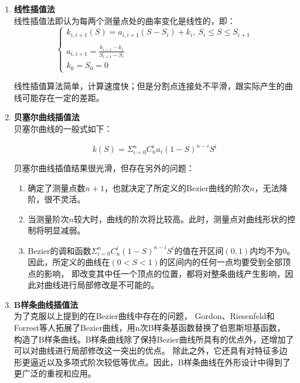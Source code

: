 \begin{enumerate}[label=(\Alph*)]
    \item \textbf{线性插值法} \\
    线性插值法即认为每两个测量点处的曲率变化是线性的，即：
    \begin{equation}
    \left\{
        \begin{array}{lr}
        k_{i, i+1} (S) = a_{i, i+1} (S - S_i) + k_i, \ S_i\leq S\leq S_{i+1}\\
    \\
        a_{i, i+1} = \frac{k_{i+1} - k_i}{S_{i+1} - S_i}
    \\
        k_0 = S_0 = 0
        \end{array}
    \right.
    \end{equation}

    线性插值算法简单，计算速度快；但是分割点连接处不平滑，跟实际产生的曲线可能存在一定的差距。

    \item \textbf{贝塞尔曲线插值法} \\
    贝塞尔曲线的一般式如下：

    \begin{equation}
        k(S) = \Sigma_{i=0}^nC_n ^ i a_i(1-S)^{n - i}S^i
    \end{equation}

    贝塞尔曲线插值结果很光滑，但存在另外的问题：

    \begin{enumerate}[label=(\alph*)]
        \item 确定了测量点数$n+1$，也就决定了所定义的Bezier曲线的阶次$n$，无法降阶，很不灵活。
        \item 当测量阶次$n$较大时，曲线的阶次将比较高。此时，测量点对曲线形状的控制将明显减弱。
        \item Bezier的调和函数$\Sigma_{i=0}^nC_n ^ i (1-S)^{n - i}S^i$的值在开区间$(0,1)$内均不为0。
        因此，所定义的曲线在$(0<S<1)$的区间内的任何一点均要受到全部顶点的影响，
        即改变其中任一个顶点的位置，都将对整条曲线产生影响，因此对曲线进行局部修改是不可能的。
    \end{enumerate}

    \item \textbf{B样条曲线插值法} \\
    为了克服以上提到的在Bezier曲线中存在的问题，
    Gordon、Riesenfeld和Forrest等人拓展了Bezier曲线，用n次B样条基函数替换了伯恩斯坦基函数，
    构造了B样条曲线。B样条曲线除了保持Bezier曲线所具有的优点外，还增加了可以对曲线进行局部修改这一突出的优点。
    除此之外，它还具有对特征多边形更逼近以及多项式阶次较低等优点。因此，B样条曲线在外形设计中得到了更广泛的重视和应用。


\end{enumerate}

